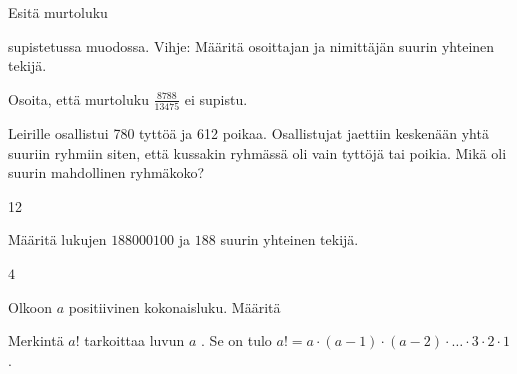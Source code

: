 \begin{tehtava}
    Esitä murtoluku
    \begin{alakohdat}
    \end{alakohdat}
    supistetussa muodossa. Vihje: Määritä osoittajan ja nimittäjän suurin yhteinen tekijä.

    \begin{vastaus}
        \begin{alakohdat}
        \end{alakohdat}
    \end{vastaus}
    
\end{tehtava}

\begin{tehtava}
    Osoita, että murtoluku $\frac{8788}{13475}$ ei supistu.
\end{tehtava}

\begin{tehtava}
    Leirille osallistui 780 tyttöä ja 612 poikaa. Osallistujat jaettiin keskenään yhtä suuriin ryhmiin siten, että kussakin ryhmässä oli vain tyttöjä tai poikia. Mikä oli suurin mahdollinen ryhmäkoko?
    
    \begin{vastaus}
        12
    \end{vastaus}
    
\end{tehtava}

\begin{tehtava}
    Määritä lukujen $188000100$ ja $188$ suurin yhteinen tekijä.

    \begin{vastaus}
        $4$
    \end{vastaus}
    
\end{tehtava}

\begin{tehtava}
    Olkoon $a$ positiivinen kokonaisluku. Määritä
    \begin{alakohdat}
    \end{alakohdat}
    Merkintä $a!$ tarkoittaa luvun $a$ . Se on tulo $a! = a \cdot (a-1) \cdot (a-2) \cdot \ldots \cdot 3 \cdot 2 \cdot 1$.

    \begin{vastaus}
        \begin{alakohdat}
        \end{alakohdat}
    \end{vastaus}
    
\end{tehtava}

